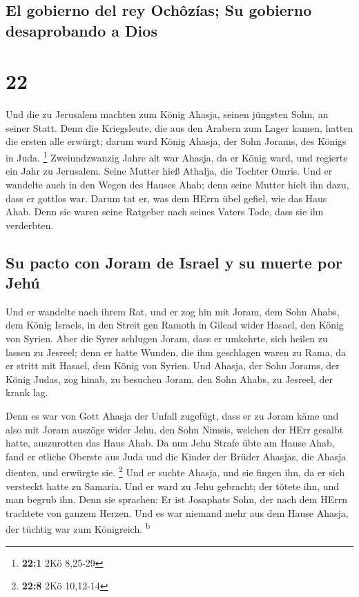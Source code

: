 \hypertarget{el-gobierno-del-rey-ochuxf4zuxedas-su-gobierno-desaprobando-a-dios}{%
\subsection{El gobierno del rey Ochôzías; Su gobierno desaprobando a
Dios}\label{el-gobierno-del-rey-ochuxf4zuxedas-su-gobierno-desaprobando-a-dios}}

\hypertarget{section-21}{%
\section{22}\label{section-21}}

 Und die zu Jerusalem machten zum König Ahasja, seinen
jüngsten Sohn, an seiner Statt. Denn die Kriegsleute, die aus den
Arabern zum Lager kamen, hatten die ersten alle erwürgt; darum ward
König Ahasja, der Sohn Jorams, des Königs in Juda. \footnote{\textbf{22:1}
  2Kö 8,25-29}  Zweiundzwanzig Jahre alt war Ahasja, da er
König ward, und regierte ein Jahr zu Jerusalem. Seine Mutter hieß
Athalja, die Tochter Omris.  Und er wandelte auch in den
Wegen des Hauses Ahab; denn seine Mutter hielt ihn dazu, dass er gottlos
war.  Darum tat er, was dem HErrn übel gefiel, wie das
Haus Ahab. Denn sie waren seine Ratgeber nach seines Vaters Tode, dass
sie ihn verderbten.

\hypertarget{su-pacto-con-joram-de-israel-y-su-muerte-por-jehuxfa}{%
\subsection{Su pacto con Joram de Israel y su muerte por
Jehú}\label{su-pacto-con-joram-de-israel-y-su-muerte-por-jehuxfa}}

 Und er wandelte nach ihrem Rat, und er zog hin mit Joram,
dem Sohn Ahabs, dem König Israels, in den Streit gen Ramoth in Gilead
wider Hasael, den König von Syrien. Aber die Syrer schlugen Joram,
 dass er umkehrte, sich heilen zu lassen zu Jesreel; denn
er hatte Wunden, die ihm geschlagen waren zu Rama, da er stritt mit
Hasael, dem König von Syrien. Und Ahasja, der Sohn Jorams, der König
Judas, zog hinab, zu besuchen Joram, den Sohn Ahabs, zu Jesreel, der
krank lag.

 Denn es war von Gott Ahasja der Unfall zugefügt, dass er
zu Joram käme und also mit Joram auszöge wider Jehu, den Sohn Nimsis,
welchen der HErr gesalbt hatte, auszurotten das Haus Ahab.
 Da nun Jehu Strafe übte am Hause Ahab, fand er etliche
Oberste aus Juda und die Kinder der Brüder Ahasjas, die Ahasja dienten,
und erwürgte sie. \footnote{\textbf{22:8} 2Kö 10,12-14} 
Und er suchte Ahasja, und sie fingen ihn, da er sich versteckt hatte zu
Samaria. Und er ward zu Jehu gebracht; der tötete ihn, und man begrub
ihn. Denn sie sprachen: Er ist Josaphats Sohn, der nach dem HErrn
trachtete von ganzem Herzen. Und es war niemand mehr aus dem Hause
Ahasja, der tüchtig war zum Königreich. \textsuperscript{b}

